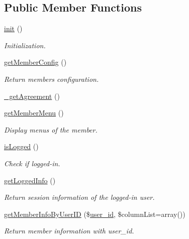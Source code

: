 \subsection*{Public Member Functions}
\begin{DoxyCompactItemize}
\item 
\hyperlink{classmemberModel_ae809c0b0f1c10e0352ad65e7df2a1ac9}{init} ()
\begin{DoxyCompactList}\small\item\em Initialization. \end{DoxyCompactList}\item 
\hyperlink{classmemberModel_a063f34e0a57f8e1c2737318ecd6db8c7}{get\+Member\+Config} ()
\begin{DoxyCompactList}\small\item\em Return member\textquotesingle{}s configuration. \end{DoxyCompactList}\item 
\hyperlink{classmemberModel_a77fb03f9f26568731dfad78b0b1572dd}{\+\_\+get\+Agreement} ()
\item 
\hyperlink{classmemberModel_acd26b1539d27466b84d16d2be10f82cd}{get\+Member\+Menu} ()
\begin{DoxyCompactList}\small\item\em Display menus of the member. \end{DoxyCompactList}\item 
\hyperlink{classmemberModel_a1cae2bd4d961fc6412281111a1565a3d}{is\+Logged} ()
\begin{DoxyCompactList}\small\item\em Check if logged-\/in. \end{DoxyCompactList}\item 
\hyperlink{classmemberModel_a80179b6ef63e1917514c098df24c6e93}{get\+Logged\+Info} ()
\begin{DoxyCompactList}\small\item\em Return session information of the logged-\/in user. \end{DoxyCompactList}\item 
\hyperlink{classmemberModel_a51229368446fed60d67d3349a0ac305c}{get\+Member\+Info\+By\+User\+ID} (\$\hyperlink{ko_8install_8php_a74f1a394389d774e5b4cd5d1d15413f7}{user\+\_\+id}, \$column\+List=array())
\begin{DoxyCompactList}\small\item\em Return member information with user\+\_\+id. \end{DoxyCompactList}\item 

\end{DoxyCompactItemize}
